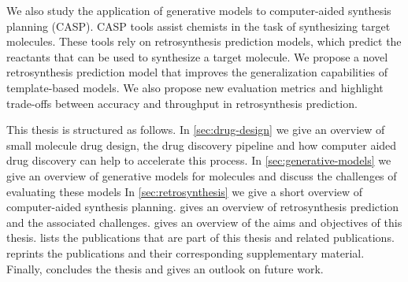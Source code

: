 We also study the application of generative models to computer-aided synthesis
planning (CASP). CASP tools assist chemists in the task of synthesizing target
molecules. These tools rely on retrosynthesis prediction models, which predict
the reactants that can be used to synthesize a target molecule. We propose a
novel retrosynthesis prediction model that improves the generalization capabilities 
of template-based models. We also propose new evaluation metrics and highlight
trade-offs between accuracy and throughput in retrosynthesis prediction.

This thesis is structured as follows. In \cref{sec:drug-design} we give an
overview of small molecule drug design, the drug discovery pipeline 
and how computer aided drug discovery can help to accelerate this process.
In \cref{sec:generative-models} we give an overview of generative models for
molecules and discuss the challenges of evaluating these models In \cref{sec:retrosynthesis} 
we give a short overview of computer-aided synthesis planning.
 gives an overview of retrosynthesis prediction and
the associated challenges.  gives an overview of the
aims and objectives of this thesis.  lists the publications 
that are part of this thesis and related publications. 
 reprints the publications and
their corresponding supplementary material. Finally, 
concludes the thesis and gives an outlook on future work.





